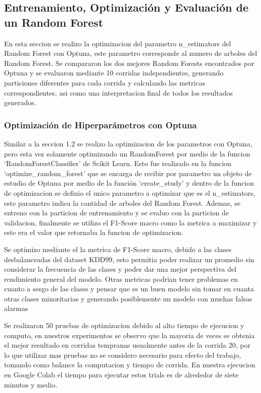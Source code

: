 \documentclass[12pt,a4paper]{article}
\begin{document}
\subsection{Entrenamiento, Optimización y Evaluación de un Random Forest}

En esta seccion se realizo la optimizacion del parametro n_estimators del Random Forest con Optuna,
este parametro corresponde al numero de arboles del Random Forest.
Se compararon los dos mejores Random Forests encontrados por Optuna y se evaluaron mediante 10 corridas independientes,
generando particiones diferentes para cada corrida y calculando las metricas correspondientes,
asi como una interpretacion final de todos los resultados generados.

\subsubsection{Optimización de Hiperparámetros con Optuna}

Similar a la seccion 1.2 se realizo la optimizacion de los parametros con Optuna, pero esta vez solamente
optimizando un RandomForest por medio de la funcion `RandomForestClassifier' de Scikit Learn.
Esto fue realizado en la funcion `optimize_random_forest' que se encarga de recibir por
parametro un objeto de estudio de Optuna por medio de la función `create_study' y dentro de la funcion
de optimizacion se definio el unico parametro a optimizar que es el n_estimators, este parametro
indica la cantidad de arboles del Random Forest.
Ademas, se entreno con la particion de entrenamiento y se evaluo con la particion de validacion,
finalmente se utilizo el F1-Score macro como la metrica a maximizar y este era el valor que retornaba la funcion de optimizacion.

Se optimizo mediante el la metrica de F1-Score macro, debido a las clases desbalanceadas del dataset KDD99, esto
permitia poder realizar un promedio sin considerar la frecuencia de las clases y poder dar una mejor
perspectiva del rendimiento general del modelo. Otras metricas podrian tener problemas en cuanto a sesgo de las clases
y pensar que es un buen modelo sin tomar en cuanta otras clases minoritarias y generando posiblemente un modelo
con muchas falsas alarmas

Se realizaron 50 pruebas de optimizacion debido al alto tiempo de ejecucion y computo, en nuestros experimentos se observo que
la mayoria de veces se obtenia el mejor resultado en corridas tempranas usualmente antes de la corrida 20, por lo que utilizar
mas pruebas no se considero necesario para efecto del trabajo, tomando como balance la computacion y tiempo de corrida.
En nuestra ejecucion en Google Colab el tiempo para ejecutar estos trials es de alrededor de siete minutos y medio.
\end{document}
